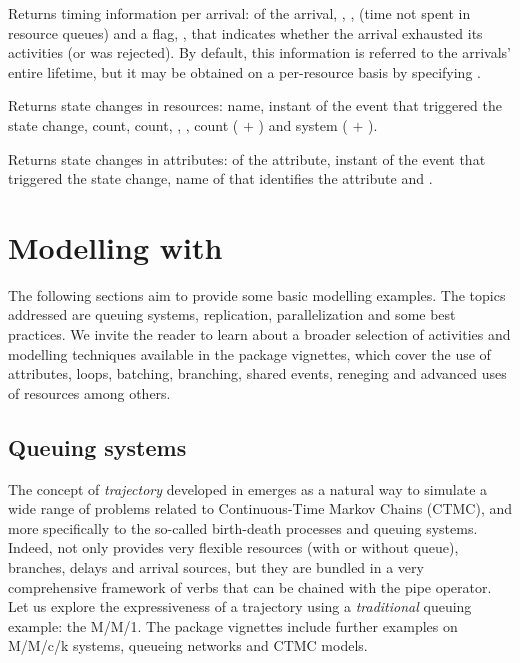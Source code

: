 \documentclass[
  nojss]{jss}
\providecommand{\tightlist}{%
  \setlength{\itemsep}{0pt}\setlength{\parskip}{0pt}}
\begin{document}
\begin{description}
\tightlist
\item[get\_mon\_arrivals()]
Returns timing information per arrival:  of the arrival,
, ,  (time not spent
in resource queues) and a flag, , that indicates whether
the arrival exhausted its activities (or was rejected). By default, this
information is referred to the arrivals' entire lifetime, but it may be
obtained on a per-resource basis by specifying .
\item[get\_mon\_resources()]
Returns state changes in resources:  name, 
instant of the event that triggered the state change, 
count,  count, , ,
 count ( \(+\) ) and system
 ( \(+\) ).
\item[get\_mon\_attributes()]
Returns state changes in attributes:  of the attribute,
 instant of the event that triggered the state change, name
of  that identifies the attribute and .
\end{description}

\section[Modelling with simmer]{Modelling with }

The following sections aim to provide some basic modelling examples. The
topics addressed are queuing systems, replication, parallelization and
some best practices. We invite the reader to learn about a broader
selection of activities and modelling techniques available in the
package vignettes, which cover the use of attributes, loops, batching,
branching, shared events, reneging and advanced uses of resources among
others.

\hypertarget{queuing-systems}{%
\subsection{Queuing systems}\label{queuing-systems}}

The concept of \emph{trajectory} developed in  emerges as a
natural way to simulate a wide range of problems related to
Continuous-Time Markov Chains (CTMC), and more specifically to the
so-called birth-death processes and queuing systems. Indeed,
 not only provides very flexible resources (with or without
queue), branches, delays and arrival sources, but they are bundled in a
very comprehensive framework of verbs that can be chained with the pipe
operator. Let us explore the expressiveness of a  trajectory
using a \emph{traditional} queuing example: the M/M/1. The package
vignettes include further examples on M/M/c/k systems, queueing networks
and CTMC models.
\end{document}
